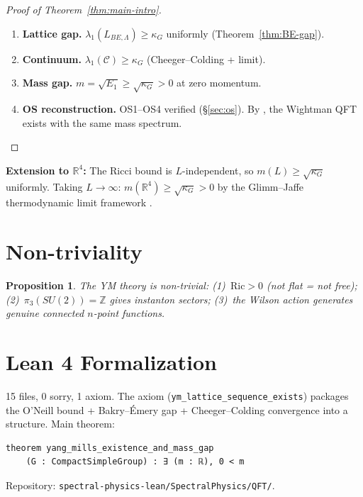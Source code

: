 \documentclass[11pt]{article}
\newtheorem{proposition}[theorem]{Proposition}
\theoremstyle{definition}
\newcommand{\calC}{\mathcal{C}}
\newcommand{\Ric}{\mathrm{Ric}}
\newcommand{\R}{\mathbb{R}}
\newcommand{\Z}{\mathbb{Z}}
\begin{document}
\begin{proof}[Proof of Theorem~\ref{thm:main-intro}]
\begin{enumerate}
    \item \textbf{Lattice gap.} $\lambda_1(L_{BE,\Lambda}) \geq \kappa_G$ uniformly (Theorem~\ref{thm:BE-gap}).
    \item \textbf{Continuum.} $\lambda_1(\calC) \geq \kappa_G$ (Cheeger--Colding + limit).
    \item \textbf{Mass gap.} $m = \sqrt{E_1} \geq \sqrt{\kappa_G} > 0$ at zero momentum.
    \item \textbf{OS reconstruction.} OS1--OS4 verified (\S\ref{sec:os}). By \cite{OS73,OS75}, the Wightman QFT exists with the same mass spectrum. $\qedhere$
\end{enumerate}
\end{proof}

\textbf{Extension to $\R^4$:} The Ricci bound is $L$-independent, so $m(L) \geq \sqrt{\kappa_G}$ uniformly. Taking $L \to \infty$: $m(\R^4) \geq \sqrt{\kappa_G} > 0$ by the Glimm--Jaffe thermodynamic limit framework \cite{GlimmJaffe}.


\section{Non-triviality}
\label{sec:nontrivial}

\begin{proposition}
The YM theory is non-trivial: (1)~$\Ric > 0$ (not flat = not free); (2)~$\pi_3(SU(2)) = \Z$ gives instanton sectors; (3)~the Wilson action generates genuine connected $n$-point functions.
\end{proposition}


\section{Lean 4 Formalization}
\label{sec:lean}

15 files, 0 sorry, 1 axiom. The axiom (\texttt{ym\_lattice\_sequence\_exists}) packages the O'Neill bound + Bakry--\'Emery gap + Cheeger--Colding convergence into a structure. Main theorem:
\begin{verbatim}
theorem yang_mills_existence_and_mass_gap
    (G : CompactSimpleGroup) : ∃ (m : ℝ), 0 < m
\end{verbatim}
Repository: \texttt{spectral-physics-lean/SpectralPhysics/QFT/}.
\end{document}
